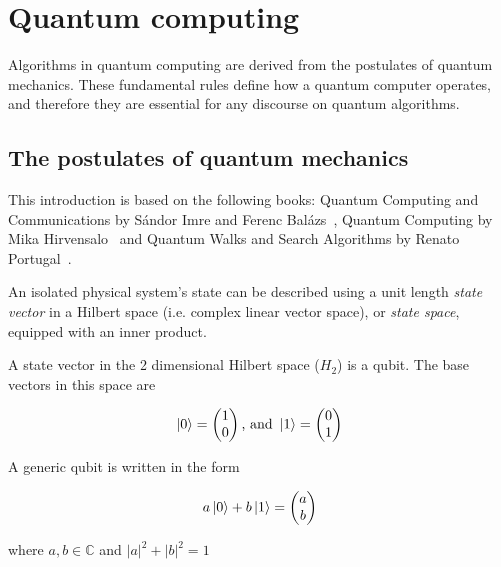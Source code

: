 \chapter{Quantum computing}

Algorithms in quantum computing are derived from the postulates of quantum mechanics. These fundamental rules define how a quantum computer operates, and therefore they are essential for any discourse on quantum algorithms.

\section{The postulates of quantum mechanics}

This introduction is based on the following books: Quantum Computing and Communications by Sándor Imre and Ferenc Balázs~\cite{ImreSandor}, Quantum Computing by Mika Hirvensalo~\cite{Hirvensalo} and Quantum Walks and Search Algorithms by Renato Portugal~\cite{Portugal}.


An isolated physical system's state can be described using a unit length \textit{state vector} in a Hilbert space (i.e. complex linear vector space), or \textit{state space}, equipped with an inner product.

\begin{definition}[Qubit]
A state vector in the 2 dimensional Hilbert space ($H_2$) is a qubit. The base vectors in this space are
\end{definition}

\begin{align*}
\ket{0} = \begin{pmatrix} 1 \\ 0 \end{pmatrix} \text{, and } \ket{1} = \begin{pmatrix} 0 \\ 1 \end{pmatrix}
\end{align*}

A generic qubit is written in the form

\begin{align*}
a\ket{0} + b\ket{1} = \begin{pmatrix} a \\ b \end{pmatrix}
\end{align*}

where $a, b \in{} \mathds{C}$ and $|a|^2 + |b|^2 = 1$

